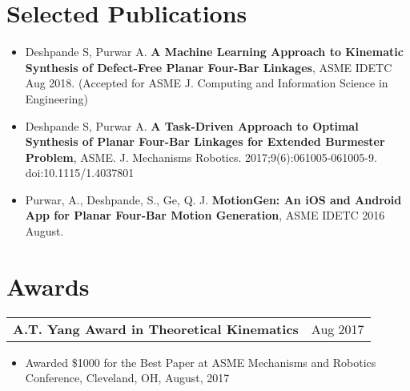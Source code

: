 \documentclass[letterpaper,10pt]{article}
\makeatletter
\newcommand{\resumeHeading}[4]{
  \vspace{-1pt}
    \begin{tabular*}{0.97\textwidth}{l@{\extracolsep{\fill}}r}
      \textbf{#1} & #2 \vspace{-2pt}\\ \vspace{1pt}
      \textit{\small#3} & \textit{\small #4} \\
    \end{tabular*}
}
\newcommand{\resumeSubheadingWithDate}[2]{
    \begin{tabular*}{0.97\textwidth}{l@{\extracolsep{\fill}}r}
      \small\textbf{#1} & \small #2 \\
    \end{tabular*}
    \vspace{+2pt}
}
\newcommand{\resumeSection}[1]{
\vspace{-12pt}
\section{\textbf{#1}}
}
\newcommand{\resumeItemListStart}{
\vspace{-7pt}
\begin{itemize}[leftmargin=14pt]
}
\newcommand{\resumeItemListEnd}{
\vspace{+7pt}
\end{itemize}
}
\newcommand{\resumeItem}[1]{
  \item\small{
      {#1 \vspace{-7pt}
      }
  }
}
\makeatother
\begin{document}


\resumeSection{Selected Publications}
\vspace{+7pt}
    \resumeItemListStart
      \resumeItem{Deshpande S, Purwar A. \textbf{A Machine Learning Approach to Kinematic Synthesis of Defect-Free Planar Four-Bar Linkages}, ASME IDETC Aug 2018. (Accepted for ASME J. Computing and Information Science in Engineering)}
      \resumeItem{Deshpande S, Purwar A. \textbf{A Task-Driven Approach to Optimal Synthesis of Planar Four-Bar Linkages for Extended Burmester Problem}, ASME. J. Mechanisms Robotics. 2017;9(6):061005-061005-9. doi:10.1115/1.4037801}
      \resumeItem{Purwar, A., Deshpande, S., Ge, Q. J. \textbf{MotionGen: An iOS and Android App for Planar Four-Bar Motion Generation}, ASME IDETC 2016 August.}
    \resumeItemListEnd

\resumeSection{Awards}
    \resumeSubheadingWithDate{A.T. Yang Award in Theoretical Kinematics}{Aug 2017}
    \resumeItemListStart
      \resumeItem{Awarded \$1000 for the Best Paper at ASME Mechanisms and Robotics Conference, Cleveland, OH, August, 2017}
    \resumeItemListEnd
\end{document}
